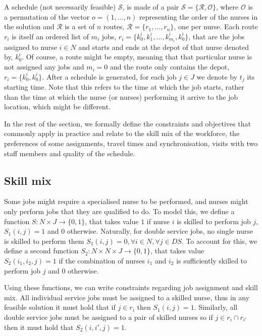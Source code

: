 \documentclass[a4paper,11pt]{elsarticle}
\begin{document}
A schedule (not necessarily feasible) $\mathcal{S}$, is made of a pair   $\mathcal{S} = \{\mathcal{R}, \mathcal{O}\}$, where $\mathcal{O}$ is a permutation of the vector $o = (1,\dots,n)$ representing the order of the nurses in the solution and $\mathcal{R}$ is a set of $n$ routes, $\mathcal{R} = \{r_1,\dots,r_n\}$, one per nurse. Each route $r_i$ is itself an ordered list of $m_i$ jobs, $r_i = \{k^i_0, k^i_1,\dots,k^i_{m_i}, k^i_0\}$, that are the jobs assigned to nurse $i \in N$ and starts and ends at the depot of that nurse denoted by, $k^i_0$. Of course, a route might be empty, meaning that that particular nurse is not assigned any jobs and $m_i = 0$ and the route only contains the depot, $r_i = \{k^i_0, k^i_0\}$.
After a schedule is generated, for each job $j \in J$ we denote by $t_j$ its starting time. Note that this refers to the time at which the job starts, rather than the time at which the nurse (or nurses) performing it arrive to the job location, which might be different.

In the rest of the section, we formally define the constraints and objectives that commonly apply in practice and relate to the skill mix of the workforce, the preferences of some assignments, travel times and synchronisation, visits with two staff members and quality of the schedule.

\subsection{Skill mix}
Some jobs might require a specialised nurse to be performed, and nurses might only perform jobs that they are qualified to do. To model this, we define a function $S: N\times J \rightarrow \{0,1\}$, that takes value $1$ if nurse $i$ is skilled to perform job $j$, $S_1(i,j) = 1$ and $0$ otherwise. 
Naturally, for double service jobs, no single nurse is skilled to perform them $S_1(i,j) = 0, \forall i \in N, \forall j \in DS$. To account for this, we define a second function $S_2: N\times N\times J \rightarrow \{0,1\}$, that takes value $S_2(i_1,i_2,j) = 1$ if the combination of nurses $i_1$ and $i_2$ is sufficiently skilled to perform job $j$ and $0$ otherwise. 

Using these functions, we can write constraints regarding job assignment and skill mix.
All individual service jobs must be assigned to a skilled nurse, thus in any feasible solution it must hold that if $j \in r_i$ then $S_1(i,j) = 1$. Similarly, all double service jobs must be assigned to a pair of skilled nurses so if $j \in r_i \cap r_{i'}$ then it must hold that $S_2(i, i', j) = 1$.
\end{document}

